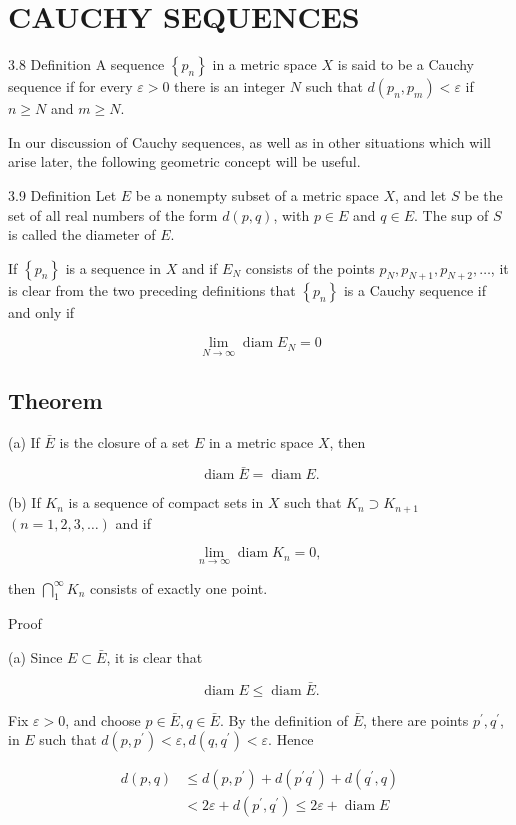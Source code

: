 \documentclass[10pt]{article}
\begin{document}
\section{CAUCHY SEQUENCES}
3.8 Definition A sequence $\left\{p_{n}\right\}$ in a metric space $X$ is said to be a Cauchy sequence if for every $\varepsilon>0$ there is an integer $N$ such that $d\left(p_{n}, p_{m}\right)<\varepsilon$ if $n \geq N$ and $m \geq N$.

In our discussion of Cauchy sequences, as well as in other situations which will arise later, the following geometric concept will be useful.

3.9 Definition Let $E$ be a nonempty subset of a metric space $X$, and let $S$ be the set of all real numbers of the form $d(p, q)$, with $p \in E$ and $q \in E$. The sup of $S$ is called the diameter of $E$.

If $\left\{p_{n}\right\}$ is a sequence in $X$ and if $E_{N}$ consists of the points $p_{N}, p_{N+1}, p_{N+2}, \ldots$, it is clear from the two preceding definitions that $\left\{p_{n}\right\}$ is a Cauchy sequence if and only if

$$
\lim _{N \rightarrow \infty} \operatorname{diam} E_{N}=0
$$

\subsection{Theorem}
(a) If $\bar{E}$ is the closure of a set $E$ in a metric space $X$, then

$$
\operatorname{diam} \bar{E}=\operatorname{diam} E .
$$

(b) If $K_{n}$ is a sequence of compact sets in $X$ such that $K_{n} \supset K_{n+1}$ $(n=1,2,3, \ldots)$ and if

$$
\lim _{n \rightarrow \infty} \operatorname{diam} K_{n}=0 \text {, }
$$

then $\bigcap_{1}^{\infty} K_{n}$ consists of exactly one point.

Proof

(a) Since $E \subset \bar{E}$, it is clear that

$$
\operatorname{diam} E \leq \operatorname{diam} \bar{E} .
$$

Fix $\varepsilon>0$, and choose $p \in \bar{E}, q \in \bar{E}$. By the definition of $\bar{E}$, there are points $p^{\prime}, q^{\prime}$, in $E$ such that $d\left(p, p^{\prime}\right)<\varepsilon, d\left(q, q^{\prime}\right)<\varepsilon$. Hence

$$
\begin{aligned}
d(p, q) & \leq d\left(p, p^{\prime}\right)+d\left(p^{\prime} q^{\prime}\right)+d\left(q^{\prime}, q\right) \\
& <2 \varepsilon+d\left(p^{\prime}, q^{\prime}\right) \leq 2 \varepsilon+\operatorname{diam} E
\end{aligned}
$$
\end{document}
